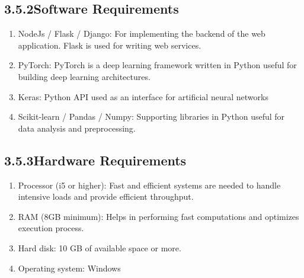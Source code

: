 \documentclass[oneside,a4paper,12pt]{book}
\begin{document}
\subsection*{3.5.2\hspace*{10pt}Software Requirements}
\begin{enumerate}
	\item NodeJs / Flask / Django: For implementing the backend of the web application. Flask is used for writing web services. 

	\item PyTorch: PyTorch is a deep learning framework written in Python useful for building deep learning architectures. \par
	
	\item Keras: Python API used as an interface for artificial neural networks
	
	\item Scikit-learn / Pandas / Numpy: Supporting libraries in Python useful for data analysis and preprocessing.

\end{enumerate}\par

\subsection*{3.5.3\hspace*{10pt}Hardware Requirements}
\begin{enumerate}
	\item Processor (i5 or higher): Fast and efficient systems are needed to handle intensive loads and provide efficient throughput.\par

	\item RAM (8GB minimum): Helps in performing fast computations and optimizes execution process.\par
	
	\item Hard disk: 10 GB of available space or more.
\item Operating system: Windows

	
\end{enumerate}\par
\end{document}
